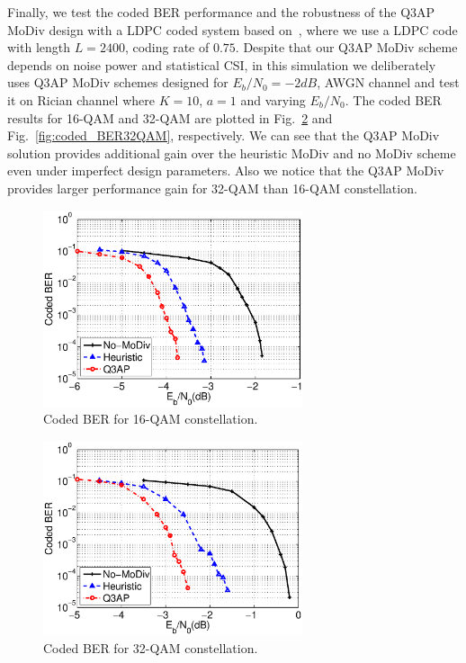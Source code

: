 \documentclass[journal]{IEEEtran}
\begin{document}
Finally, we test the coded BER performance and the robustness of the Q3AP MoDiv
design with a LDPC coded system based on~\cite{}, where we use a LDPC code with
length $L=2400$, coding rate of $0.75$. Despite that our Q3AP MoDiv scheme
depends on noise power and statistical CSI, in this simulation we deliberately
uses Q3AP MoDiv schemes designed for $E_b/N_0=-2dB$, AWGN channel and test it
on Rician channel where $K=10$, $a=1$ and varying $E_b/N_0$. The coded BER
results for 16-QAM and 32-QAM are plotted in Fig.~\ref{fig:coded_BER16QAM} and
Fig.~\ref{fig:coded_BER32QAM}, respectively. We can see that the Q3AP MoDiv
solution provides additional gain over the heuristic MoDiv and no MoDiv scheme even under imperfect design
parameters. Also we notice that the Q3AP MoDiv provides larger performance
gain for 32-QAM than 16-QAM constellation.

\begin{figure}[!t]
    \centering
    \includegraphics[width=3.0in]{./figs/coded_BER16QAM.eps}
    \caption{Coded BER for 16-QAM constellation.}
    \label{fig:coded_BER16QAM}
\end{figure}

\begin{figure}[!t]
    \centering
    \includegraphics[width=3.0in]{./figs/coded_BER32QAM.eps}
    \caption{Coded BER for 32-QAM constellation.}
    \label{fig:coded_BER16QAM}
\end{figure}
\end{document}
